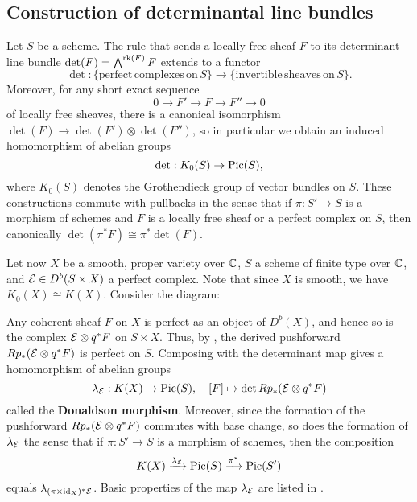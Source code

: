 \documentclass[letterpaper,12pt]{amsart}
\theoremstyle{remark}
\begin{document}
\subsection{Construction of determinantal line bundles}
Let $S$ be a scheme. The rule that sends a locally free sheaf $F$ to its determinant line bundle $\det(F) = \bigwedge^{\operatorname{\mathrm{rk}}(F)} F$ extends to a functor
\[ \det: \{\mathrm{perfect\, complexes\, on\,} S\} \to \{\mathrm{invertible\,} \mathrm{sheaves\, on}\, S \}. \]
Moreover, for any short exact sequence
\[ 0 \to F' \to F \to F'' \to 0 \]
of locally free sheaves, there is a canonical isomorphism $\det(F) \to \det(F') \otimes \det(F'')$, so in particular we obtain an induced homomorphism of abelian groups
\[ \det: K_0(S) \to \mathrm{Pic}(S), \]
where $K_0(S)$ denotes the Grothendieck group of vector bundles on $S$. These constructions commute with pullbacks in the sense that if $\pi: S' \to S$ is a morphism of schemes and $F$ is a locally free sheaf or a perfect complex on $S$, then canonically $\det(\pi^* F) \cong \pi^*\det(F)$.

Let now $X$ be a smooth, proper variety over $\mathbb{C}$, $S$ a scheme of finite type over $\mathbb{C}$, and $\mathcal{E} \in D^b(S \times X)$ a perfect complex. Note that since $X$ is smooth, we have $K_0(X) \cong K(X)$. Consider the diagram:
\begin{center}
\end{center}
Any coherent sheaf $F$ on $X$ is perfect as an object of $D^b(X)$, and hence so is the complex $\mathcal{E} \otimes q^*F$ on $S \times X$. Thus, by \cite[\href{https://stacks.math.columbia.edu/tag/0B91}{Tag 0B91}]{stacks-project}, the derived pushforward $R p_* (\mathcal{E} \otimes q^* F)$ is perfect on $S$. Composing with the determinant map gives a homomorphism of abelian groups
\[ \lambda_{\mathcal{E}}: K(X) \to \mathrm{Pic}(S), \quad [F] \mapsto \det R p_*(\mathcal{E} \otimes q^* F) \]
called the {\bf Donaldson morphism}. Moreover, since the formation of the pushforward $R p_*(\mathcal{E} \otimes q^* F)$ commutes with base change, so does the formation of $\lambda_{\mathcal{E}}$ the sense that if $\pi: S' \to S$ is a morphism of schemes, then the composition
\[ K(X) \xrightarrow{\lambda_{\mathcal{E}}} \mathrm{Pic}(S) \xrightarrow{\pi^*} \mathrm{Pic}(S') \]
equals $\lambda_{(\pi \times \mathrm{id}_X)^* \mathcal{E}}$. Basic properties of the map $\lambda_{\mathcal{E}}$ are listed in \cite[Lemma 8.1.2]{HL}.
\end{document}
